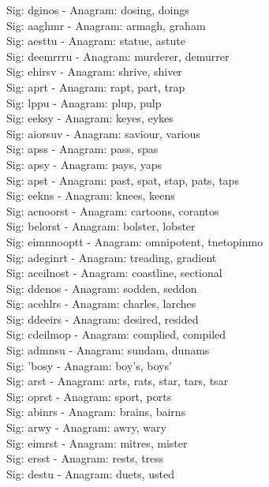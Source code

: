 Sig: {dginos} - Anagram: dosing, doings \\
Sig: {aaghmr} - Anagram: armagh, graham \\
Sig: {aesttu} - Anagram: statue, astute \\
Sig: {deemrrru} - Anagram: murderer, demurrer \\
Sig: {ehirsv} - Anagram: shrive, shiver \\
Sig: {aprt} - Anagram: rapt, part, trap \\
Sig: {lppu} - Anagram: plup, pulp \\
Sig: {eeksy} - Anagram: keyes, eykes \\
Sig: {aiorsuv} - Anagram: saviour, various \\
Sig: {apss} - Anagram: pass, spas \\
Sig: {apsy} - Anagram: pays, yaps \\
Sig: {apst} - Anagram: past, spat, stap, pats, taps \\
Sig: {eekns} - Anagram: knees, keens \\
Sig: {acnoorst} - Anagram: cartoons, corantos \\
Sig: {belorst} - Anagram: bolster, lobster \\
Sig: {eimnnooptt} - Anagram: omnipotent, tnetopinmo \\
Sig: {adeginrt} - Anagram: treading, gradient \\
Sig: {aceilnost} - Anagram: coastline, sectional \\
Sig: {ddenos} - Anagram: sodden, seddon \\
Sig: {acehlrs} - Anagram: charles, larches \\
Sig: {ddeeirs} - Anagram: desired, resided \\
Sig: {cdeilmop} - Anagram: complied, compiled \\
Sig: {admnsu} - Anagram: sundam, dunams \\
Sig: {'bosy} - Anagram: boy's, boys' \\
Sig: {arst} - Anagram: arts, rats, star, tars, tsar \\
Sig: {oprst} - Anagram: sport, ports \\
Sig: {abinrs} - Anagram: brains, bairns \\
Sig: {arwy} - Anagram: awry, wary \\
Sig: {eimrst} - Anagram: mitres, mister \\
Sig: {ersst} - Anagram: rests, tress \\
Sig: {destu} - Anagram: duets, usted \\
